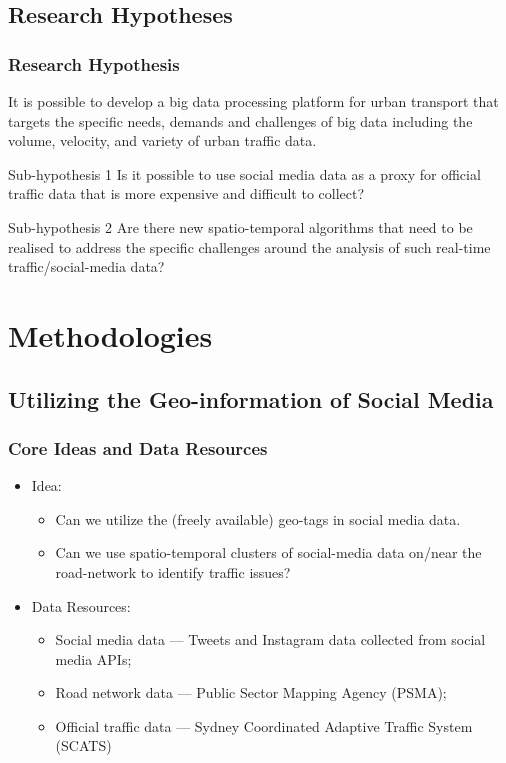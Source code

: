 \subsection{Research Hypotheses}

\begin{frame}
    \frametitle{Research Hypothesis}
    It is possible to develop a big data processing platform for urban transport that targets the specific needs, demands and challenges of big data including the volume, velocity, and variety of urban traffic data.

    \begin{block}{Sub-hypothesis 1}
    Is it possible to use social media data as a proxy for official traffic data that is more expensive and difficult to collect?
    \end{block}
    \begin{block}{Sub-hypothesis 2}
    Are there new spatio-temporal algorithms that need to be realised to address the specific challenges around the analysis of such real-time traffic/social-media data?
    \end{block}
\end{frame}

\section{Methodologies}

\subsection{Utilizing the Geo-information of Social Media}
\begin{frame}
    \frametitle{Core Ideas and Data Resources}
    \begin{itemize}
	    \item Idea:
	    \begin{itemize}
	        \item Can we utilize the (freely available) geo-tags in social media data.
	        \item Can we use spatio-temporal clusters of social-media data on/near the road-network to identify traffic issues?
	    \end{itemize}
	    \item Data Resources:
	    \begin{itemize}
	        \item Social media data --- Tweets and Instagram data collected from social media APIs;
	        \item Road network data --- Public Sector Mapping Agency (PSMA); 
	        \item Official traffic data --- Sydney Coordinated Adaptive Traffic System (SCATS)
	    \end{itemize}
    \end{itemize}
\end{frame}

